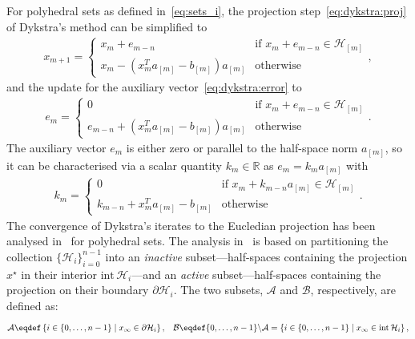For polyhedral sets as defined in~\eqref{eq:sets_i}, the projection step~\eqref{eq:dykstra:proj} of Dykstra's method can be simplified to
\begin{align}\label{eq:dykstra:proj:poly}
x_{m+1}=
\begin{cases}
x_{m}+e_{m-n} & \text{if } x_{m}+e_{m-n}\in\mathcal{H}_{[m]}\\
x_{m} - \left(x_{m}^T a_{[m]} - b_{[m]}\right) a_{[m]} & \text{otherwise}
\end{cases},
\end{align}
and the update for the auxiliary vector~\eqref{eq:dykstra:error} to
\begin{align}\label{eq:dykstra:error:poly}
e_m=
\begin{cases}
0 & \text{if } x_{m}+e_{m-n}\in\mathcal{H}_{[m]}\\
e_{m-n}+\left(x_{m}^T a_{[m]} - b_{[m]}\right) a_{[m]} & \text{otherwise}
\end{cases}.
\end{align}
The auxiliary vector $e_m$ is either zero or parallel to the half-space norm $a_{[m]}$, so it can be characterised via a scalar quantity $k_m \in \mathbb{R}$ as $e_m = k_m a_{[m]}$ with 
\begin{align}\label{eq:km}
k_m = 
\begin{cases}
0 & \text{if } x_{m}+k_{m-n}a_{[m]}\in\mathcal{H}_{[m]}\\
k_{m-n} + x_m^T a_{[m]} - b_{[m]} & \text{otherwise}
\end{cases}.
\end{align}
The convergence of Dykstra's iterates to the Eucledian projection has been analysed in~\cite{DYKSTRAPERKINS,DYKSTRAPOLY,DYKSTRAPOLY2} for polyhedral sets. The analysis in~\cite{DYKSTRAPOLY} is based on partitioning the collection $\{\mathcal{H}_i\}_{i=0}^{n-1}$ into an \emph{inactive} subset---half-spaces containing the projection $x^\star$ in their interior $\text{int}\,\mathcal{H}_i$---and an \emph{active} subset---half-spaces containing the projection on their boundary $\partial\mathcal{H}_i$. The two subsets, $\mathcal{A}$ and $\mathcal{B}$, respectively, are defined as:
\begin{align}
&\mathcal{A} \eqdef \set{i\in\lbrace 0,\dots,n-1\rbrace}{x_\infty\in \partial\mathcal{H}_i},
&\mathcal{B}\eqdef \lbrace 0,\dots,n-1\rbrace\backslash \mathcal{A}=\set{i\in\lbrace 0,\dots,n-1\rbrace}{x_\infty\in \text{int}\,\mathcal{H}_i},
\end{align}

